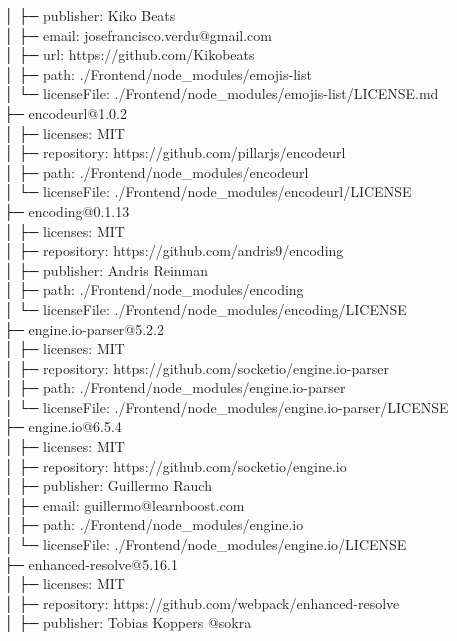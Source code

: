 │  ├─ publisher: Kiko Beats\\
│  ├─ email: josefrancisco.verdu@gmail.com\\
│  ├─ url: https://github.com/Kikobeats\\
│  ├─ path: ./Frontend/node\_modules/emojis-list\\
│  └─ licenseFile: ./Frontend/node\_modules/emojis-list/LICENSE.md\\
├─ encodeurl@1.0.2\\
│  ├─ licenses: MIT\\
│  ├─ repository: https://github.com/pillarjs/encodeurl\\
│  ├─ path: ./Frontend/node\_modules/encodeurl\\
│  └─ licenseFile: ./Frontend/node\_modules/encodeurl/LICENSE\\
├─ encoding@0.1.13\\
│  ├─ licenses: MIT\\
│  ├─ repository: https://github.com/andris9/encoding\\
│  ├─ publisher: Andris Reinman\\
│  ├─ path: ./Frontend/node\_modules/encoding\\
│  └─ licenseFile: ./Frontend/node\_modules/encoding/LICENSE\\
├─ engine.io-parser@5.2.2\\
│  ├─ licenses: MIT\\
│  ├─ repository: https://github.com/socketio/engine.io-parser\\
│  ├─ path: ./Frontend/node\_modules/engine.io-parser\\
│  └─ licenseFile: ./Frontend/node\_modules/engine.io-parser/LICENSE\\
├─ engine.io@6.5.4\\
│  ├─ licenses: MIT\\
│  ├─ repository: https://github.com/socketio/engine.io\\
│  ├─ publisher: Guillermo Rauch\\
│  ├─ email: guillermo@learnboost.com\\
│  ├─ path: ./Frontend/node\_modules/engine.io\\
│  └─ licenseFile: ./Frontend/node\_modules/engine.io/LICENSE\\
├─ enhanced-resolve@5.16.1\\
│  ├─ licenses: MIT\\
│  ├─ repository: https://github.com/webpack/enhanced-resolve\\
│  ├─ publisher: Tobias Koppers @sokra\\
